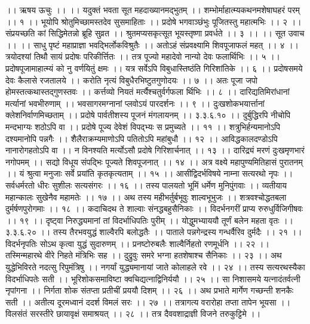 ।। ऋषय ऊचुः ।। ।।
यदुक्तं भवता सूत महदाख्यानमद्भुतम् ।।
शम्भोर्माहात्म्यकथनमशेषाघहरं परम् ।। १ ।।
भूयोपि श्रोतुमिच्छामस्तदेव सुसमाहिताः ।।
प्रदोषे भगवाञ्छंभुः पूजितस्तु महात्मभिः ।। २ ।।
संप्रयच्छति कां सिद्धिमेतन्नो ब्रूहि सुव्रत ।।
श्रुतमप्यसकृत्सूत भूयस्तृष्णा प्रवर्धते ।। ३ ।।
।। सूत उवाच ।। ।।
साधु पृष्टं महाप्राज्ञा भवद्भिर्लोकविश्रुतैः ।।
अतोऽहं संप्रवक्ष्यामि शिवपूजाफलं महत् ।। ४ ।।
त्रयोदश्यां तिथौ सायं प्रदोषः परिकीर्त्तितः ।।
तत्र पूज्यो महादेवो नान्यो देवः फलार्थिभिः ।। ५ ।।
प्रदोषपूजामाहात्म्यं को नु वर्णयितुं क्षमः ।।
यत्र सर्वेऽपि विबुधास्तिष्ठंति गिरिशांतिके ।। ६ ।।
प्रदोषसमये देवः कैलासे रजतालये ।।
करोति नृत्यं विबुधैरभिष्टुतगुणोदयः ।। ७ ।।
अतः पूजा जपो होमस्तत्कथास्तद्गुणस्तवः ।।
कर्त्तव्यो नियतं मर्त्यैश्चतुर्वर्गफला र्थिभिः ।। ८ ।।
दारिद्यतिमिरांधानां मर्त्यानां भवभीरुणाम् ।।
भवसागरमग्नानां प्लवोऽयं पारदर्शनः ।। ९ ।।
दुःखशोकभयार्त्तानां क्लेशनिर्वाणमिच्छताम् ।।
प्रदोषे पार्वतीशस्य पूजनं मंगलायनम् ।। ३.३.६.१० ।।
दुर्बुद्धिरपि नीचोपि मन्दभाग्यः शठोऽपि वा ।।
प्रदोषे पूज्य देवेशं विपद्भ्यः स प्रमुच्यते ।। ११ ।।
शत्रुभिर्हन्यमानोऽपि दश्यमानोपि पन्नगैः ।।
शैलैराक्रम्यमाणोऽपि पतितोऽपि महांबुधौ ।। १२ ।।
आविद्धकालदण्डोऽपि नानारोगहतोऽपि वा ।।
न विनश्यति मर्त्योऽसौ प्रदोषे गिरिशार्चनात् ।। १३ ।।
दारिद्र्यं मरणं दुःखमृणभारं नगोपमम् ।।
सद्यो विधूय संपद्भिः पूज्यते शिवपूजनात् ।। १४ ।।
अत्र वक्ष्ये महापुण्यमितिहासं पुरातनम् ।।
यं श्रुत्वा मनुजाः सर्वे प्रयांति कृतकृत्यताम् ।। १५ ।।
आसीद्विदर्भविषये नाम्ना सत्यरथो नृपः ।।
सर्वधर्मरतो धीरः सुशीलः सत्यसंगरः ।। १६ ।।
तस्य पालयतो भूमिं धर्मेण मुनिपुंगवाः ।।
व्यतीयाय महान्कालः सुखेनैव महामतेः ।। १७ ।।
अथ तस्य महीभर्तुर्बभूवुः शाल्वभूभुजः ।।
शत्रवश्चोद्धतबला दुर्मर्षणपुरोगमाः ।। १८ ।।
कदाचिदथ ते शाल्वाः संनद्धबहुसैनिकाः ।।
विदर्भनगरीं प्राप्य रुरुधुर्विजिगीषवः ।। १९ ।।
दृष्ट्वा निरुद्ध्यमानां तां विदर्भाधिपतिः पुरीम् ।।
योद्धुमभ्याययौ तूर्णं बलेन महता वृतः ।। ३.३.६.२० ।।
तस्य तैरभवयुद्धं शाल्वैरपि बलोद्धतैः ।।
पाताले पन्नगेन्द्रस्य गन्धर्वैरिव दुर्मदैः ।। २१ ।।
विदर्भनृपतिः सोऽथ कृत्वा युद्धं सुदारुणम् ।।
प्रनष्टोरुबलैः शाल्वैर्निहतो रणमूर्धनि ।। २२ ।।
तस्मिन्महारथे वीरे निहते मंत्रिभिः सह ।।
दुद्रुवुः समरे भग्ना हतशेषाश्च सैनिकाः ।। २३ ।।
अथ युद्धेभिविरते नदत्सु रिपुमंत्रिषु ।।
नगर्यां युद्ध्यमानायां जाते कोलाहले रवे ।। २४ ।।
तस्य सत्यरथस्यैका विदर्भाधिपतेः सती ।।
भूरिशोकसमाविष्टा क्वचिद्यत्नाद्विनिर्ययौ ।। २५ ।।
सा निशासमये यत्नादंतर्वत्नी नृपांगना ।।
निर्गता शोक संतप्ता प्रतीचीं प्रययौ दिशम् ।। २६ ।।
अथ प्रभाते मार्गेण गच्छन्ती शनकैः सती ।।
अतीत्य दूरमध्वानं ददर्श विमलं सरः ।। २७ ।।
तत्रागत्य वरारोहा तप्ता तापेन भूयसा ।।
विलसंतं सरस्तीरे छायावृक्षं समाश्रयत् ।। २८ ।।
तत्र दैववशाद्राज्ञी विजने तरुकुट्टिमे ।।
